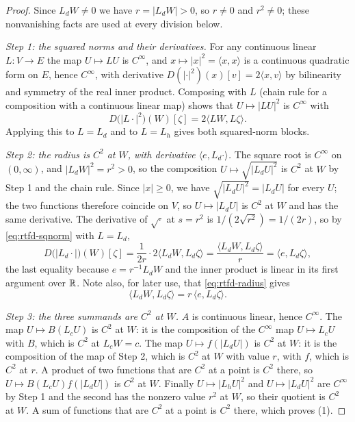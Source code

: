 \begin{proof}
Since $L_dW\ne0$ we have $r=|L_dW|>0$, so $r\ne0$ and $r^2\ne0$; these
nonvanishing facts are used at every division below.

\emph{Step 1: the squared norms and their derivatives.} For any continuous
linear $L:V\to E$ the map $U\mapsto L U$ is $C^\infty$, and $x\mapsto|x|^2
=\langle x,x\rangle$ is a continuous quadratic form on $E$, hence $C^\infty$,
with derivative $D(|\cdot|^2)(x)[v]=2\langle x,v\rangle$ by bilinearity and
symmetry of the real inner product. Composing with $L$ (chain rule for a
composition with a continuous linear map) shows that $U\mapsto|LU|^2$ is
$C^\infty$ with
\begin{equation}\label{eq:rtfd-sqnorm}
  D\bigl(|L\cdot|^2\bigr)(W)[\zeta]=2\langle LW,L\zeta\rangle .
\end{equation}
Applying this to $L=L_d$ and to $L=L_h$ gives both squared-norm blocks.

\emph{Step 2: the radius is $C^2$ at $W$, with derivative $\langle e,L_d\cdot
\rangle$.} The square root is $C^\infty$ on $(0,\infty)$, and
$|L_dW|^2=r^2>0$, so the composition $U\mapsto\sqrt{|L_dU|^2}$ is $C^2$ at $W$
by Step 1 and the chain rule. Since $|x|\ge0$, we have
$\sqrt{|L_dU|^2}=|L_dU|$ for every $U$; the two functions therefore coincide on
$V$, so $U\mapsto|L_dU|$ is $C^2$ at $W$ and has the same derivative. The
derivative of $\sqrt{\cdot}$ at $s=r^2$ is $1/(2\sqrt{r^2})=1/(2r)$, so by
\eqref{eq:rtfd-sqnorm} with $L=L_d$,
\begin{equation}\label{eq:rtfd-radius}
  D\bigl(|L_d\cdot|\bigr)(W)[\zeta]
   =\frac1{2r}\cdot2\langle L_dW,L_d\zeta\rangle
   =\frac{\langle L_dW,L_d\zeta\rangle}{r}
   =\langle e,L_d\zeta\rangle,
\end{equation}
the last equality because $e=r^{-1}L_dW$ and the inner product is linear in its
first argument over $\mathbb{R}$. Note also, for later use, that \eqref{eq:rtfd-radius}
gives
\begin{equation}\label{eq:rtfd-flip}
  \langle L_dW,L_d\zeta\rangle=r\,\langle e,L_d\zeta\rangle .
\end{equation}

\emph{Step 3: the three summands are $C^2$ at $W$.} $A$ is continuous linear,
hence $C^\infty$. The map $U\mapsto B(L_cU)$ is $C^2$ at $W$: it is the
composition of the $C^\infty$ map $U\mapsto L_cU$ with $B$, which is $C^2$ at
$L_cW=c$. The map $U\mapsto f(|L_dU|)$ is $C^2$ at $W$: it is the composition of
the map of Step 2, which is $C^2$ at $W$ with value $r$, with $f$, which is
$C^2$ at $r$. A product of two functions that are $C^2$ at a point is $C^2$
there, so $U\mapsto B(L_cU)f(|L_dU|)$ is $C^2$ at $W$. Finally
$U\mapsto|L_hU|^2$ and $U\mapsto|L_dU|^2$ are $C^\infty$ by Step 1 and the
second has the nonzero value $r^2$ at $W$, so their quotient is $C^2$ at $W$. A
sum of functions that are $C^2$ at a point is $C^2$ there, which proves (1).


\end{proof}
